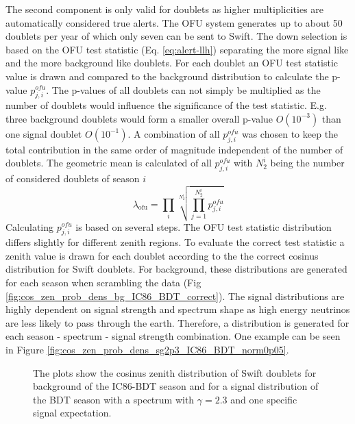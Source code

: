 The second component is only valid for doublets as higher multiplicities are 
automatically considered true alerts. The OFU system generates up to about 50 
doublets per year of which only seven can be sent to Swift. The down selection 
is based on the OFU test statistic (Eq. \ref{eq:alert-llh}) separating the more 
signal like and the more background like doublets. For each doublet an OFU test 
statistic value is drawn and compared to the background distribution to 
calculate the p-value $p_{j, i}^{ofu}$. The p-values of all doublets can not 
simply be multiplied as the number of doublets would influence the significance 
of the test statistic. E.g. three background doublets would form a smaller 
overall p-value $O(10^{-3})$ than one signal doublet $O(10^{-1})$. A combination 
of all $p_{j,i}^{ofu}$ was chosen to keep the total contribution in the same 
order of magnitude independent of the number of doublets.
The geometric mean is calculated of all $p_{j,i}^{ofu}$ with $N_2^i$ being the 
number of considered 
doublets of season $i$
\begin{equation}
\label{eq:lambda_ofu}
 \lambda_\text{ofu} = \prod_i \sqrt[N_2^i]{\prod_{j=1}^{N_2^i} p_{j,i}^{ofu}}
\end{equation}
Calculating $p_{j,i}^{ofu}$ is based on several steps. The OFU test statistic 
distribution differs slightly for different zenith regions. To evaluate the 
correct test 
statistic a zenith value is drawn for each doublet according to the the correct 
cosinus distribution for Swift doublets. For background, these distributions 
are generated for each season when scrambling the data (Fig 
\ref{fig:cos_zen_prob_dens_bg_IC86_BDT_correct}). The signal distributions are 
highly dependent on signal strength and spectrum shape as high energy neutrinos 
are less likely to pass through the earth. Therefore, a distribution is 
generated for each season - spectrum - signal strength combination. One example 
can be seen in Figure \ref{fig:cos_zen_prob_dens_sg2p3_IC86_BDT_norm0p05}.

\begin{figure}[h]
\centering
 \captionsetup{width=.85\textwidth}
 \caption{The plots show the cosinus zenith distribution of Swift doublets for 
background of the 
IC86-BDT season and for a signal distribution of the BDT season with a 
spectrum with $\gamma=2.3$ and one specific signal expectation.}
\label{fig:cos_zen_prob_dens_bg_IC86_BDT}
\end{figure}

